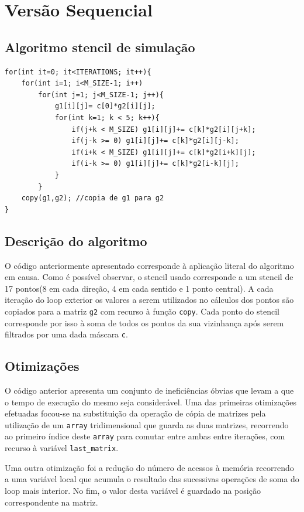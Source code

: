\documentclass{article}
\begin{document}
\section{Versão Sequencial}

\subsection{Algoritmo stencil de simulação}
\begin{verbatim}
for(int it=0; it<ITERATIONS; it++){
    for(int i=1; i<M_SIZE-1; i++)
        for(int j=1; j<M_SIZE-1; j++){
            g1[i][j]= c[0]*g2[i][j];
            for(int k=1; k < 5; k++){
                if(j+k < M_SIZE) g1[i][j]+= c[k]*g2[i][j+k];
                if(j-k >= 0) g1[i][j]+= c[k]*g2[i][j-k];
                if(i+k < M_SIZE) g1[i][j]+= c[k]*g2[i+k][j];
                if(i-k >= 0) g1[i][j]+= c[k]*g2[i-k][j];
            }
        }
    copy(g1,g2); //copia de g1 para g2
}
\end{verbatim}

\subsection{Descrição do algoritmo}
O código anteriormente apresentado corresponde à aplicação literal do algoritmo em causa. Como é possível observar, o stencil usado corresponde a um stencil de 
17 pontos(8 em cada direção, 4 em cada sentido e 1 ponto central). A cada iteração do loop exterior os valores a serem utilizados no cálculos dos pontos são
copiados para a matriz \texttt{g2} com recurso à função \texttt{copy}. Cada ponto do stencil corresponde por isso à soma de todos os pontos da sua vizinhança após serem filtrados por uma dada máscara \texttt{c}.

\subsection{Otimizações}
O código anterior apresenta um conjunto de ineficiências óbvias que levam a que o tempo de execução do mesmo seja considerável.
Uma das primeiras otimizações efetuadas focou-se na substituição da operação de cópia de matrizes pela utilização de um \texttt{array} tridimensional que
guarda as duas matrizes, recorrendo ao primeiro índice deste \texttt{array} para comutar entre ambas entre iterações, com recurso à variável \texttt{last\_matrix}.

Uma outra otimização foi a redução do número de acessos à memória recorrendo a uma variável local que acumula o resultado das sucessivas operações de soma do loop mais interior. 
No fim, o valor desta variável é guardado na posição correspondente na matriz.
\end{document}
